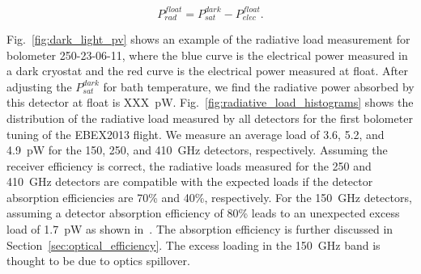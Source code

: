 \documentclass[../EBEXPaper2.tex]{subfiles}
\begin{document}
\begin{equation}
P_{rad}^{float} = P_{sat}^{dark} - P_{elec}^{float}.
\label{eq:boloPopt}
\end{equation}


Fig.~\ref{fig:dark_light_pv} shows an example of the radiative load measurement for bolometer 250-23-06-11, where the blue curve is the electrical power measured in a dark cryostat and the red curve is the electrical power measured at float.
After adjusting the $P_{sat}^{dark}$ for bath temperature, we find the radiative power absorbed by this detector at float is XXX~pW. 
Fig.~\ref{fig:radiative_load_histograms} shows the distribution of the radiative load measured by all detectors for the first bolometer tuning of the \ac{EBEX2013} flight.
We measure an average load of 3.6, 5.2, and 4.9~pW for the 150, 250, and 410~GHz detectors, respectively.
Assuming the receiver efficiency is correct, the radiative loads measured for the 250 and 410~GHz detectors are compatible with the expected loads if the detector absorption efficiencies are 70\% and 40\%, respectively.
For the 150~GHz detectors, assuming a detector absorption efficiency of 80\% leads to an unexpected excess load of 1.7~pW as shown in~\cite{MacDermid_thesis}.
The absorption efficiency is further discussed in Section~\ref{sec:optical_efficiency}.
The excess loading in the 150~GHz band is thought to be due to optics spillover.

\end{document}
